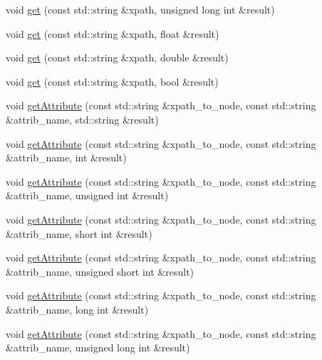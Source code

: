 \begin{DoxyCompactItemize}
\item 
void \mbox{\hyperlink{classXMLXPathReader_1_1BasicXPathReader_a3ab8225861b822d1018da05ead0f7533}{get}} (const std\+::string \&xpath, unsigned long int \&result)
\item 
void \mbox{\hyperlink{classXMLXPathReader_1_1BasicXPathReader_ac56f127ddd0e7b5919fe8f2027cb6ada}{get}} (const std\+::string \&xpath, float \&result)
\item 
void \mbox{\hyperlink{classXMLXPathReader_1_1BasicXPathReader_a5ce86f38b945414d91f609a2fdca04b2}{get}} (const std\+::string \&xpath, double \&result)
\item 
void \mbox{\hyperlink{classXMLXPathReader_1_1BasicXPathReader_aab6419964a5b28ab22299d389b9d3b7b}{get}} (const std\+::string \&xpath, bool \&result)
\item 
void \mbox{\hyperlink{classXMLXPathReader_1_1BasicXPathReader_a963a9741f352a537bfe1a460a307c074}{get\+Attribute}} (const std\+::string \&xpath\+\_\+to\+\_\+node, const std\+::string \&attrib\+\_\+name, std\+::string \&result)
\item 
void \mbox{\hyperlink{classXMLXPathReader_1_1BasicXPathReader_a67a27824521cbe011f99c2cafff83239}{get\+Attribute}} (const std\+::string \&xpath\+\_\+to\+\_\+node, const std\+::string \&attrib\+\_\+name, int \&result)
\item 
void \mbox{\hyperlink{classXMLXPathReader_1_1BasicXPathReader_a67ba99141bc047b9f362167e4d8f8da3}{get\+Attribute}} (const std\+::string \&xpath\+\_\+to\+\_\+node, const std\+::string \&attrib\+\_\+name, unsigned int \&result)
\item 
void \mbox{\hyperlink{classXMLXPathReader_1_1BasicXPathReader_a6151cd103f1730ac598ec9d63cf11229}{get\+Attribute}} (const std\+::string \&xpath\+\_\+to\+\_\+node, const std\+::string \&attrib\+\_\+name, short int \&result)
\item 
void \mbox{\hyperlink{classXMLXPathReader_1_1BasicXPathReader_a4ba2827d293f02d0470c1b156258ee96}{get\+Attribute}} (const std\+::string \&xpath\+\_\+to\+\_\+node, const std\+::string \&attrib\+\_\+name, unsigned short int \&result)
\item 
void \mbox{\hyperlink{classXMLXPathReader_1_1BasicXPathReader_a93aba6e8e1f1bb9ea9646fd9c785ba17}{get\+Attribute}} (const std\+::string \&xpath\+\_\+to\+\_\+node, const std\+::string \&attrib\+\_\+name, long int \&result)
\item 
void \mbox{\hyperlink{classXMLXPathReader_1_1BasicXPathReader_ab4fb1448173672498fc795296d838ac9}{get\+Attribute}} (const std\+::string \&xpath\+\_\+to\+\_\+node, const std\+::string \&attrib\+\_\+name, unsigned long int \&result)

\end{DoxyCompactItemize}
